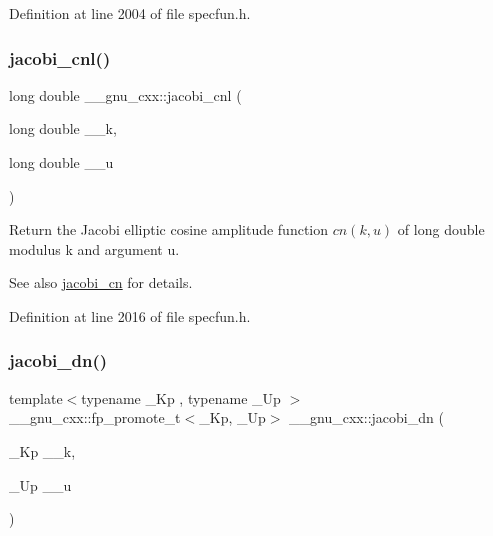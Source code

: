 Definition at line 2004 of file specfun.\+h.

\mbox{\label{group__mathsf__gnu_ga08892965ea520116cc53a764513fe685}} 
\subsubsection{\texorpdfstring{jacobi\+\_\+cnl()}{jacobi\_cnl()}}
{\footnotesize\ttfamily long double \+\_\+\+\_\+gnu\+\_\+cxx\+::jacobi\+\_\+cnl (\begin{DoxyParamCaption}\item[{long double}]{\+\_\+\+\_\+k,  }\item[{long double}]{\+\_\+\+\_\+u }\end{DoxyParamCaption})\hspace{0.3cm}{\ttfamily [inline]}}

Return the Jacobi elliptic cosine amplitude function $ cn(k,u) $ of {\ttfamily long double} modulus {\ttfamily k} and argument {\ttfamily u}.

\begin{DoxySeeAlso}{See also}
\hyperlink{group__mathsf__gnu_ga2e1c43b232d378164bed1433041ca7dc}{jacobi\+\_\+cn} for details. 
\end{DoxySeeAlso}


Definition at line 2016 of file specfun.\+h.

\mbox{\label{group__mathsf__gnu_ga0f8fa8d6a77dbc2089d65f3f16876aa9}} 
\subsubsection{\texorpdfstring{jacobi\+\_\+dn()}{jacobi\_dn()}}
{\footnotesize\ttfamily template$<$typename \+\_\+\+Kp , typename \+\_\+\+Up $>$ \\
\+\_\+\+\_\+gnu\+\_\+cxx\+::fp\+\_\+promote\+\_\+t$<$\+\_\+\+Kp, \+\_\+\+Up$>$ \+\_\+\+\_\+gnu\+\_\+cxx\+::jacobi\+\_\+dn (\begin{DoxyParamCaption}\item[{\+\_\+\+Kp}]{\+\_\+\+\_\+k,  }\item[{\+\_\+\+Up}]{\+\_\+\+\_\+u }\end{DoxyParamCaption})\hspace{0.3cm}{\ttfamily [inline]}}

